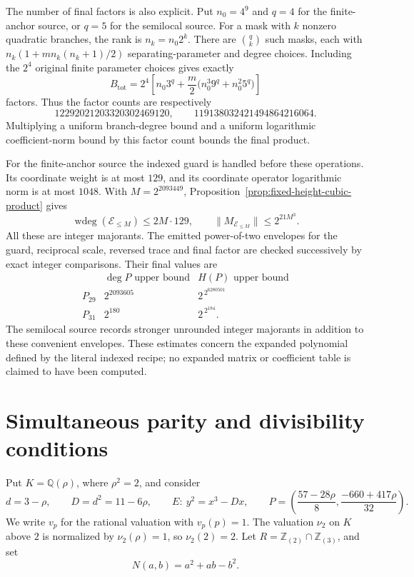 \documentclass[11pt,a4paper]{article}
\theoremstyle{definition}
\theoremstyle{remark}
\begin{document}
The number of final factors is also explicit.  Put $n_0=4^9$ and
$q=4$ for the finite-anchor source, or $q=5$ for the semilocal
source.  For a mask with $k$ nonzero quadratic branches, the rank is
$n_k=n_0 2^k$.  There are $\binom qk$ such masks, each with
$n_k(1+mn_k(n_k+1)/2)$ separating-parameter and degree choices.
Including the $2^4$ original finite parameter choices gives exactly
\[
 B_{\mathrm{tot}}=2^4\left[
 n_0 3^q+\frac m2\bigl(n_0^3 9^q+n_0^2 5^q\bigr)\right]
\]
factors.  Thus the factor counts are respectively
\[
 12292021203320302469120,\qquad
 119138032421494864216064.
\]
Multiplying a uniform branch-degree bound and a uniform logarithmic
coefficient-norm bound by this factor count bounds the final product.

For the finite-anchor source the indexed guard is handled before these
operations.  Its coordinate weight is at most $129$, and its coordinate
operator logarithmic norm is at most $1048$.  With $M=2^{2093449}$,
Proposition~\ref{prop:fixed-height-cubic-product} gives
\[
 \operatorname{wdeg}(\mathcal E_{\le M})\le 2M\cdot129,
 \qquad
 \|M_{\mathcal E_{\le M}}\|\le 2^{21M^3}.
\]
All these are integer majorants.  The emitted power-of-two envelopes
for the guard, reciprocal scale, reversed trace and final factor are
checked successively by exact integer comparisons.  Their final values
are
\[
 \begin{array}{c|cc}
 &\deg P\text{ upper bound}&H(P)\text{ upper bound}\\ \hline
 P_{29}&2^{2093605}&2^{\,2^{6280501}}\\
 P_{31}&2^{180}&2^{\,2^{184}}.
 \end{array}
\]
The semilocal source records stronger unrounded integer majorants in
addition to these convenient envelopes.  These estimates concern the
expanded polynomial defined by the literal indexed recipe; no expanded
matrix or coefficient table is claimed to have been computed.
\section{Simultaneous parity and divisibility conditions}
\label{sec:parity-batching}

Put $K=\mathbb Q(\rho)$, where $\rho^2=2$, and consider
\[
 d=3-\rho,\qquad D=d^2=11-6\rho,\qquad
 E:\ y^2=x^3-Dx,
 \qquad
 P=\left(\frac{57-28\rho}{8},
          \frac{-660+417\rho}{32}\right).
\]
We write $v_p$ for the rational valuation with $v_p(p)=1$.
The valuation $\nu_2$ on $K$ above $2$ is normalized by
$\nu_2(\rho)=1$, so $\nu_2(2)=2$.
Let $R=\mathbb Z_{(2)}\cap\mathbb Z_{(3)}$, and set
\[
                         N(a,b)=a^2+ab-b^2.
\]
\end{document}

